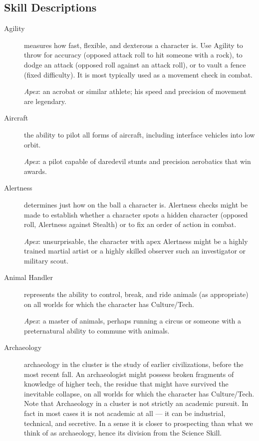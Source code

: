 \subsection{Skill Descriptions}

\begin{description}
\item[Agility]
measures how fast, flexible, and dexterous a character is. Use Agility to throw for accuracy (opposed attack roll to hit someone with a rock), to dodge an attack (opposed roll against an attack roll), or to vault a fence (fixed difficulty). It is most typically used as a movement check in combat.

\emph{Apex}: an acrobat or similar athlete; his speed and precision of movement are legendary.

\item[Aircraft]
the ability to pilot all forms of aircraft, including interface vehicles into low orbit.

\emph{Apex}: a pilot capable of daredevil stunts and precision aerobatics that win awards.

\item[Alertness]
determines just how on the ball a character is. Alertness checks might be made to establish whether a character spots a hidden character (opposed roll, Alertness against Stealth) or to fix an order of action in combat.

\emph{Apex}: unsurprisable, the character with apex Alertness might be a highly trained martial artist or a highly skilled observer such an investigator or military scout.

\item[Animal Handler]
represents the ability to control, break, and ride animals (as appropriate) on all worlds for which the character has Culture/Tech.

\emph{Apex}: a master of animals, perhaps running a circus or someone with a preternatural ability to commune with animals.

\item[Archaeology]
archaeology in the cluster is the study of earlier civilizations, before the most recent fall. An archaeologist might possess broken fragments of knowledge of higher tech, the residue that might have survived the inevitable collapse, on all worlds for which the character has Culture/Tech. Note that Archaeology in a cluster is not strictly an academic pursuit. In fact in most cases it is not academic at all --- it can be industrial, technical, and secretive. In a sense it is closer to prospecting than what we think of as archaeology, hence its division from the Science Skill.


\end{description}
